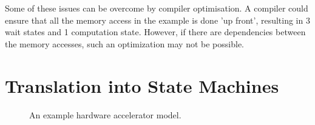 \documentclass{UoYCSproject}
\begin{document}
Some of these issues can be overcome by compiler optimisation. A compiler could ensure that all the memory access in the example
is done 'up front', resulting in 3 wait states and 1 computation state. However, if there are dependencies between
the memory accesses, such an optimization may not be possible.

\section{Translation into State Machines}

\begin{figure}[ht]
  \centering
  
  \caption{An example hardware accelerator model.}
  \label{fig:exampleStateMachine}
\end{figure}

\printbibliography
\end{document}
